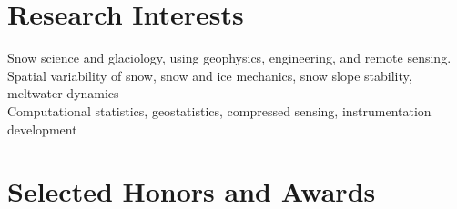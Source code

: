 \documentclass[11pt]{article}
\begin{document}

\section*{Research Interests}
Snow science and glaciology, using geophysics, engineering, and remote sensing. \\
Spatial variability of snow, snow and ice mechanics, snow slope stability, meltwater dynamics \\
Computational statistics, geostatistics, compressed sensing, instrumentation development \\

\section*{Selected Honors and Awards}
\end{document}
